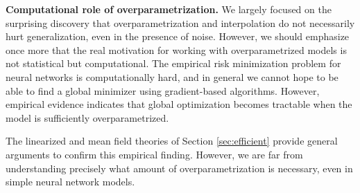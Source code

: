 {\bf Computational role of overparametrization.} We largely focused on the surprising discovery that overparametrization and interpolation do not necessarily hurt generalization, even in the presence of noise. However, we should emphasize once more that the real motivation for working with overparametrized models is not statistical but computational. The empirical risk minimization problem for neural networks is computationally hard, and in general we cannot hope to be able to find a global minimizer using gradient-based algorithms. However, empirical evidence indicates that global optimization becomes tractable when the model is sufficiently overparametrized.

  The linearized and mean field theories of Section \ref{sec:efficient} provide general arguments to confirm this empirical finding. However, we are far from understanding precisely what amount of overparametrization is necessary, even in simple neural network models.


